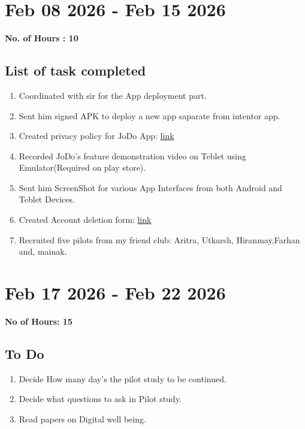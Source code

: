 \documentclass[12pt]{article}
\begin{document}
\section{Feb 08 2026 - Feb 15 2026}
{\bf No. of Hours : 10 }
\subsection{List of task completed}
\begin{enumerate}
    \item Coordinated with sir for the App deployment part.
    \item Sent him signed APK to deploy a new app saparate from intentor app.
    \item Created privacy policy for JoDo App: \href{https://hariom575.github.io/jodo-privacy-policy/}{link}
    \item Recorded JoDo's feature demonstration video on Teblet using Emulator(Required on play store).
    \item Sent him ScreenShot for various App Interfaces from both Android and Teblet Devices.
    \item Created Account deletion form: \href{https://docs.google.com/forms/d/e/1FAIpQLSd2vWw8eGdYTU90m4CK05EfslhvGtIjgv8H-nlqEfTZkk-4IA/viewform}{link}
    \item Recruited five pilots from my friend club: Aritra, Utkarsh, Hiranmay,Farhan and, mainak.
    
\end{enumerate}
\section{Feb 17 2026 - Feb 22 2026}
{\bf No of Hours: 15}
\subsection{To Do}
\begin{enumerate}
    \item Decide How many day's the pilot study to be continued.
    \item Decide what questions to ask in Pilot study.
    \item Read papers on Digital well being.
\end{enumerate}
\end{document}
